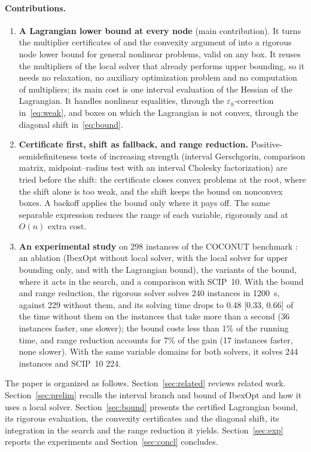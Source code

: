 \documentclass[11pt]{article}
\begin{document}
\paragraph{Contributions.}
\begin{enumerate}
\item \textbf{A Lagrangian lower bound at every node} (main contribution). It turns the
  multiplier certificates of \citet{Neumaier2004} and the convexity argument of
  \citet{Neumaier1996} into a rigorous node lower bound for general nonlinear problems,
  valid on any box. It reuses the multipliers of the local solver that already performs
  upper bounding, so it needs no relaxation, no auxiliary optimization problem and no
  computation of multipliers; its main cost is one interval evaluation of the Hessian
  of the Lagrangian. It handles nonlinear equalities, through the
  $\varepsilon_h$-correction in~\eqref{eq:weak}, and boxes on which the Lagrangian is
  not convex, through the diagonal shift in~\eqref{eq:bound}.
\item \textbf{Certificate first, shift as fallback, and range reduction.}
  Positive-semidefiniteness tests of increasing strength (interval Gerschgorin,
  comparison matrix, midpoint--radius test with an interval Cholesky factorization) are
  tried before the shift: the certificate closes convex problems at the root, where the
  shift alone is too weak, and the shift keeps the bound on nonconvex boxes. A backoff
  applies the bound only where it pays off. The same separable expression reduces the
  range of each variable, rigorously and at $O(n)$ extra cost.
\item \textbf{An experimental study} on 298 instances of the COCONUT benchmark
  \citep{Shcherbina2003}: an ablation (IbexOpt without local solver, with the local
  solver for upper bounding only, and with the Lagrangian bound), the variants of the
  bound, where it acts in the search, and a comparison with SCIP~10. With the bound and
  range reduction, the rigorous solver solves 240 instances in 1200~s, against 229
  without them, and its solving time drops to 0.48 [0.33, 0.66] of the time without them
  on the instances that take more than a second (36 instances faster, one slower); the
  bound costs less than 1\% of the running time, and range reduction accounts for 7\% of
  the gain (17 instances faster, none slower). With the same variable domains for both
  solvers, it solves 244 instances and SCIP~10 224.
\end{enumerate}

The paper is organized as follows. Section~\ref{sec:related} reviews related work.
Section~\ref{sec:prelim} recalls the interval branch and bound of IbexOpt and how it
uses a local solver. Section~\ref{sec:bound} presents the certified Lagrangian bound, its rigorous
evaluation, the convexity certificates and the diagonal shift, its integration in the
search and the range reduction it yields. Section~\ref{sec:exp} reports the experiments
and Section~\ref{sec:concl} concludes.
\end{document}
